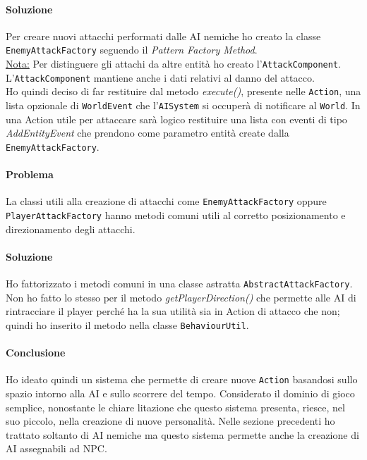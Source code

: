 \documentclass[a4paper,12pt]{report}
\begin{document}
\paragraph{Soluzione}
Per creare nuovi attacchi performati dalle AI nemiche ho creato la classe \texttt{EnemyAttackFactory} seguendo il 
\textit{Pattern Factory Method}.\\

\underline{Nota:} Per distinguere gli attachi da altre entità ho creato l'\texttt{AttackComponent}.
L'\texttt{AttackComponent} mantiene anche i dati relativi al danno del attacco.\\

Ho quindi deciso di far restituire dal metodo \textit{execute()}, presente nelle \texttt{Action}, una 
lista opzionale di \texttt{WorldEvent} che l'\texttt{AISystem} si occuperà di notificare al \texttt{World}.
In una Action utile per attaccare sarà logico restituire una lista con eventi di tipo \textit{AddEntityEvent}
che prendono come parametro entità create dalla \texttt{EnemyAttackFactory}.

\paragraph{Problema}
La classi utili alla creazione di attacchi come \texttt{EnemyAttackFactory} oppure \texttt{PlayerAttackFactory}
hanno metodi comuni utili al corretto posizionamento e direzionamento degli attacchi.
\paragraph{Soluzione}
Ho fattorizzato i metodi comuni in una classe astratta \texttt{AbstractAttackFactory}.
Non ho fatto lo stesso per il metodo \textit{getPlayerDirection()} che permette alle
AI di rintracciare il player perché ha la sua utilità sia in Action di attacco che non;
quindi ho inserito il metodo nella classe \texttt{BehaviourUtil}. 

\paragraph{Conclusione}
Ho ideato quindi un sistema che permette di creare nuove \texttt{Action} basandosi sullo spazio 
intorno alla AI e sullo scorrere del tempo. 
Considerato il dominio di gioco semplice, nonostante le chiare litazione che questo sistema presenta, 
riesce, nel suo piccolo, nella creazione di nuove personalità.
Nelle sezione precedenti ho trattato soltanto di AI nemiche ma questo sistema
permette anche la creazione di AI assegnabili ad NPC.
\end{document}

